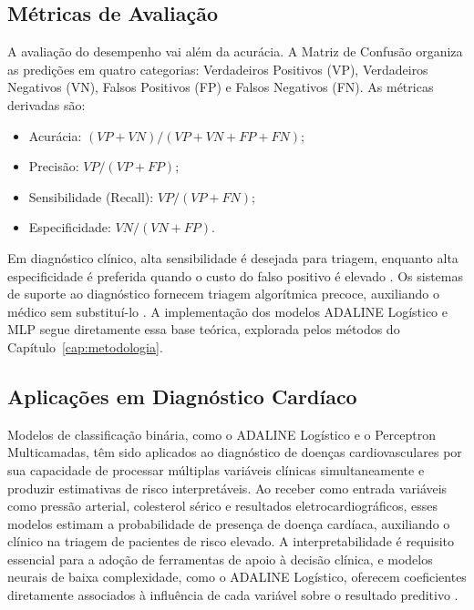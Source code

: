 \subsection{Métricas de Avaliação}
\label{sec:metricas}

A avaliação do desempenho vai além da acurácia. A Matriz de Confusão organiza as predições em quatro categorias: Verdadeiros Positivos (VP), Verdadeiros Negativos (VN), Falsos Positivos (FP) e Falsos Negativos (FN). As métricas derivadas são:
\begin{itemize}
    \item Acurácia: $(VP + VN) / (VP + VN + FP + FN)$;
    \item Precisão: $VP / (VP + FP)$;
    \item Sensibilidade (Recall): $VP / (VP + FN)$;
    \item Especificidade: $VN / (VN + FP)$.
\end{itemize}

Em diagnóstico clínico, alta sensibilidade é desejada para triagem, enquanto alta especificidade é preferida quando o custo do falso positivo é elevado \cite{braga2007}. Os sistemas de suporte ao diagnóstico fornecem triagem algorítmica precoce, auxiliando o médico sem substituí-lo \cite{rand2006}. A implementação dos modelos ADALINE Logístico e MLP segue diretamente essa base teórica, explorada pelos métodos do Capítulo~\ref{cap:metodologia}.

\subsection{Aplicações em Diagnóstico Cardíaco}
\label{sec:aplicacoes_cardiacas}

Modelos de classificação binária, como o ADALINE Logístico e o Perceptron Multicamadas, têm sido aplicados ao diagnóstico de doenças cardiovasculares por sua capacidade de processar múltiplas variáveis clínicas simultaneamente e produzir estimativas de risco interpretáveis. Ao receber como entrada variáveis como pressão arterial, colesterol sérico e resultados eletrocardiográficos, esses modelos estimam a probabilidade de presença de doença cardíaca, auxiliando o clínico na triagem de pacientes de risco elevado. A interpretabilidade é requisito essencial para a adoção de ferramentas de apoio à decisão clínica, e modelos neurais de baixa complexidade, como o ADALINE Logístico, oferecem coeficientes diretamente associados à influência de cada variável sobre o resultado preditivo \cite{mesquita2020}.

